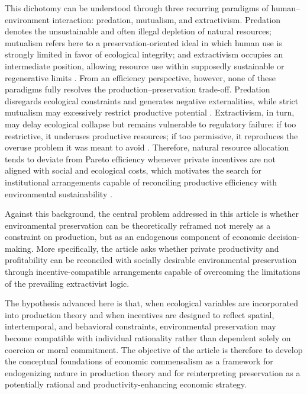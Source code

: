 This dichotomy can be understood through three recurring paradigms of human--environment interaction: predation, mutualism, and extractivism. Predation denotes the unsustainable and often illegal depletion of natural resources; mutualism refers here to a preservation-oriented ideal in which human use is strongly limited in favor of ecological integrity; and extractivism occupies an intermediate position, allowing resource use within supposedly sustainable or regenerative limits \cite{gudynas2009diez, acosta2013extractivism}. From an efficiency perspective, however, none of these paradigms fully resolves the production--preservation trade-off. Predation disregards ecological constraints and generates negative externalities, while strict mutualism may excessively restrict productive potential \cite{dasgupta2001human, ostrom1990commons}. Extractivism, in turn, may delay ecological collapse but remains vulnerable to regulatory failure: if too restrictive, it underuses productive resources; if too permissive, it reproduces the overuse problem it was meant to avoid \cite{chichilnisky2017north}. Therefore, natural resource allocation tends to deviate from Pareto efficiency whenever private incentives are not aligned with social and ecological costs, which motivates the search for institutional arrangements capable of reconciling productive efficiency with environmental sustainability \cite{hanley2007environmental}.

Against this background, the central problem addressed in this article is whether environmental preservation can be theoretically reframed not merely as a constraint on production, but as an endogenous component of economic decision-making. More specifically, the article asks whether private productivity and profitability can be reconciled with socially desirable environmental preservation through incentive-compatible arrangements capable of overcoming the limitations of the prevailing extractivist logic.

The hypothesis advanced here is that, when ecological variables are incorporated into production theory and when incentives are designed to reflect spatial, intertemporal, and behavioral constraints, environmental preservation may become compatible with individual rationality rather than dependent solely on coercion or moral commitment. The objective of the article is therefore to develop the conceptual foundations of economic commensalism as a framework for endogenizing nature in production theory and for reinterpreting preservation as a potentially rational and productivity-enhancing economic strategy.

